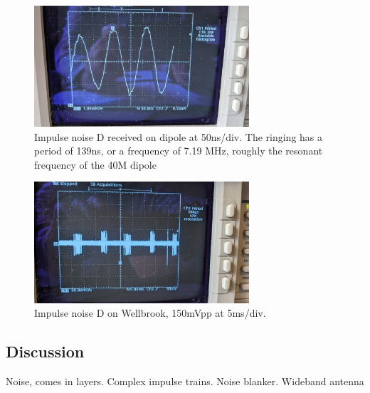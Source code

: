 \documentclass{article}
\begin{document}
\begin{figure}[h]
\caption{Impulse noise D received on dipole at 50ns/div.  The ringing has a period of 139ns, or a frequency of 7.19 MHz, roughly the resonant frequency of the 40M dipole}
\label{fig:D_dipole_50ns}
\begin{center}
\includegraphics[width=8cm]{D_dipole_50ns.jpg}
\end{center}
\end{figure}

\begin{figure}[h]
\caption{Impulse noise D on Wellbrook, 150mVpp at 5ms/div.}
\label{fig:D_wellbrook_5ms}
\begin{center}
\includegraphics[width=8cm]{D_wellbrook_5ms.jpg}
\end{center}
\end{figure}

\subsection{Discussion}

Noise, comes in layers.
Complex impulse trains.  Noise blanker.  Wideband antenna



\end{document}
